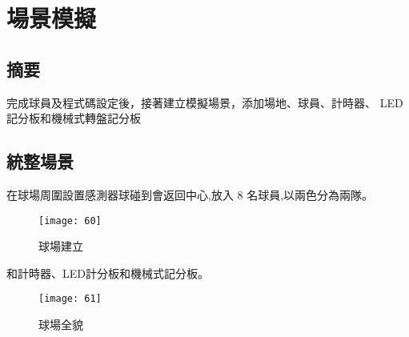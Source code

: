 \chapter{場景模擬}
\renewcommand{\baselinestretch}{10.0} %
\setcounter{page}{7}  %
\fontsize{14pt}{2.5pt}\sectionef
\section{摘要}
  完成球員及程式碼設定後，接著建立模擬場景，添加場地、球員、計時器、 LED 記分板和機械式轉盤記分板\\
\section{統整場景}
  在球場周圍設置感測器球碰到會返回中心,放入 8 名球員,以兩色分為兩隊。\\
\begin{figure}[hbt!]
\begin{center}
\texttt{[image: 60]}
\caption{\Large 球場建立}\label{總2}
\end{center}
\end{figure}

  和計時器、LED計分板和機械式記分板。\\
\begin{figure}[hbt!]
\begin{center}
\texttt{[image: 61]}
\caption{\Large 球場全貌}\label{總}
\end{center}
\end{figure}
\renewcommand{\baselinestretch}{1} %